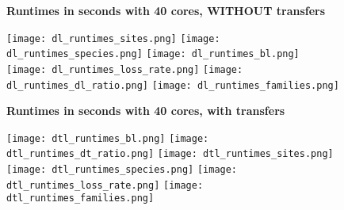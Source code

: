 \documentclass[12pt,a4paper]{article}
\begin{document}
\newcommand*{\figuretitle}[1]{%
    {\centering%
    \textbf{#1}%
    \par\medskip}%
}





\begin{figure}
\figuretitle{Runtimes in seconds with 40 cores, WITHOUT transfers}
\texttt{[image: dl\_runtimes\_sites.png]}
\texttt{[image: dl\_runtimes\_species.png]}
\texttt{[image: dl\_runtimes\_bl.png]}
\texttt{[image: dl\_runtimes\_loss\_rate.png]}
\texttt{[image: dl\_runtimes\_dl\_ratio.png]}
\texttt{[image: dl\_runtimes\_families.png]}
\end{figure}


\begin{figure}
\figuretitle{Runtimes in seconds with 40 cores, with transfers}
\texttt{[image: dtl\_runtimes\_bl.png]}
\texttt{[image: dtl\_runtimes\_dt\_ratio.png]}
\texttt{[image: dtl\_runtimes\_sites.png]}
\texttt{[image: dtl\_runtimes\_species.png]}
\texttt{[image: dtl\_runtimes\_loss\_rate.png]}
\texttt{[image: dtl\_runtimes\_families.png]}
\end{figure}
\end{document}
